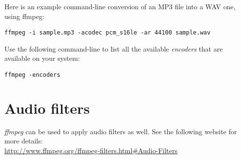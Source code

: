 \documentclass[a4paper]{book}
\begin{document}
Here is an example command-line conversion of an MP3 file into a WAV one, using
ffmpeg:
\begin{verbatim}
ffmpeg -i sample.mp3 -acodec pcm_s16le -ar 44100 sample.wav
\end{verbatim}

Use the following command-line to list all the available \textit{encoders}
that are available on your system:
\begin{verbatim}
ffmpeg -encoders
\end{verbatim}

\section{Audio filters}
\textit{ffmpeg} can be used to apply audio filters as well. See the following
website for more details: \\

\url{http://www.ffmpeg.org/ffmpeg-filters.html#Audio-Filters}{}


\end{document}
